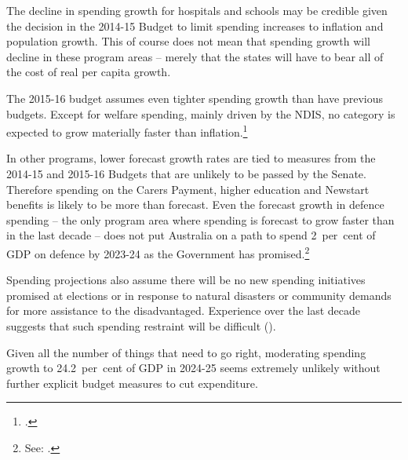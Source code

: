 \documentclass{grattanAlpha}
\begin{document}
The decline in spending growth for hospitals and schools may be credible given the decision in the 2014-15 Budget to limit spending increases to inflation and population growth. This of course does not mean that spending growth will decline in these program areas – merely that the states will have to bear all of the cost of real per capita growth.

The 2015-16 budget assumes even tighter spending growth than have previous budgets. Except for welfare spending, mainly driven by the NDIS, no category is expected to grow materially faster than inflation.\footcite[][BP No.~1, pp.--11]{Treasury2015BudgetPapers201516}  

In other programs, lower forecast growth rates are tied to measures from the 2014-15 and 2015-16 Budgets that are unlikely to be passed by the Senate. Therefore spending on the Carers Payment, higher education and Newstart benefits is likely to be more than forecast. Even the forecast growth in defence spending – the only program area where spending is forecast to grow faster than in the last decade – does not put Australia on a path to spend 2~per~cent of GDP on defence by 2023-24 as the Government has promised.\footnote{See: \textcite[][1]{Defence2014}.} 


Spending projections also assume there will be no new spending initiatives promised at elections or in response to natural disasters or community demands for more assistance to the disadvantaged. Experience over the last decade suggests that such spending restraint will be difficult ().

Given all the number of things that need to go right, moderating spending growth to 24.2~per~cent of GDP in 2024-25 seems extremely unlikely without further explicit budget measures to cut expenditure.
\end{document}
